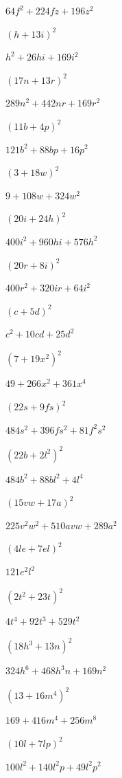 \documentclass[
  ngerman,
]{book}
\begin{document}
\leavevmode\hypertarget{toggleText7}{}%
\(64f^2+224fz+196z^2\)

\((h+13i)^2\)

\leavevmode\hypertarget{toggleText8}{}%
\(h^2+26hi+169i^2\)

\((17n+13r)^2\)

\leavevmode\hypertarget{toggleText9}{}%
\(289n^2+442nr+169r^2\)

\((11b+4p)^2\)

\leavevmode\hypertarget{toggleText10}{}%
\(121b^2+88bp+16p^2\)

\((3+18w)^2\)

\leavevmode\hypertarget{toggleText11}{}%
\(9+108w+324w^2\)

\((20i+24h)^2\)

\leavevmode\hypertarget{toggleText12}{}%
\(400i^2+960hi+576h^2\)

\((20r+8i)^2\)

\leavevmode\hypertarget{toggleText13}{}%
\(400r^2+320ir+64i^2\)

\((c+5d)^2\)

\leavevmode\hypertarget{toggleText14}{}%
\(c^2+10cd+25d^2\)

\((7+19x^2)^2\)

\leavevmode\hypertarget{toggleText15}{}%
\(49+266x^2+361x^4\)

\((22s+9fs)^2\)

\leavevmode\hypertarget{toggleText16}{}%
\(484s^2+396fs^2+81f^2s^2\)

\((22b+2l^2)^2\)

\leavevmode\hypertarget{toggleText17}{}%
\(484b^2+88bl^2+4l^4\)

\((15vw+17a)^2\)

\leavevmode\hypertarget{toggleText18}{}%
\(225v^2w^2+510avw+289a^2\)

\((4le+7el)^2\)

\leavevmode\hypertarget{toggleText19}{}%
\(121e^2l^2\)

\((2t^2+23t)^2\)

\leavevmode\hypertarget{toggleText20}{}%
\(4t^4+92t^3+529t^2\)

\((18h^3+13n)^2\)

\leavevmode\hypertarget{toggleText21}{}%
\(324h^6+468h^3n+169n^2\)

\((13+16m^4)^2\)

\leavevmode\hypertarget{toggleText22}{}%
\(169+416m^4+256m^8\)

\((10l+7lp)^2\)

\leavevmode\hypertarget{toggleText23}{}%
\(100l^2+140l^2p+49l^2p^2\)
\end{document}

